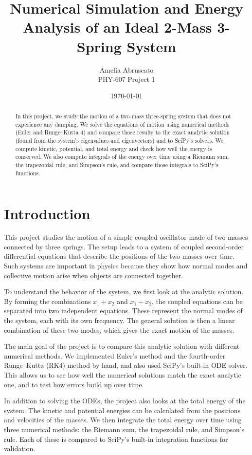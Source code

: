 \documentclass[12pt]{article}
\title{Numerical Simulation and Energy Analysis of an Ideal 2-Mass 3-Spring System}
\author{Amelia Abruscato \\ PHY-607 Project 1}
\date{\today}
\begin{document}
\maketitle

\begin{abstract}
In this project, we study the motion of a two-mass three-spring system that does not experience any damping. We solve the equations of motion using numerical methods (Euler and Runge–Kutta 4) and compare those results to the exact analytic solution (found from the system's eigenvalues and eigenvectors) and to SciPy's solvers. We compute kinetic, potential, and total energy and check how well the energy is conserved. We also compute integrals of the energy over time using a Riemann sum, the trapezoidal rule, and Simpson's rule, and compare those integrals to SciPy's functions.
\end{abstract}

\section{Introduction}
This project studies the motion of a simple coupled oscillator made of two masses connected by three springs. The setup leads to a system of coupled second-order differential equations that describe the positions of the two masses over time. Such systems are important in physics because they show how normal modes and collective motion arise when objects are connected together.  

To understand the behavior of the system, we first look at the analytic solution. By forming the combinations $x_1+x_2$ and $x_1-x_2$, the coupled equations can be separated into two independent equations. These represent the normal modes of the system, each with its own frequency. The general solution is then a linear combination of these two modes, which gives the exact motion of the masses.  

The main goal of the project is to compare this analytic solution with different numerical methods. We implemented Euler's method and the fourth-order Runge–Kutta (RK4) method by hand, and also used SciPy's built-in ODE solver. This allows us to see how well the numerical solutions match the exact analytic one, and to test how errors build up over time.  

In addition to solving the ODEs, the project also looks at the total energy of the system. The kinetic and potential energies can be calculated from the positions and velocities of the masses. We then integrate the total energy over time using three numerical methods: the Riemann sum, the trapezoidal rule, and Simpson's rule. Each of these is compared to SciPy's built-in integration functions for validation.  
\end{document}
